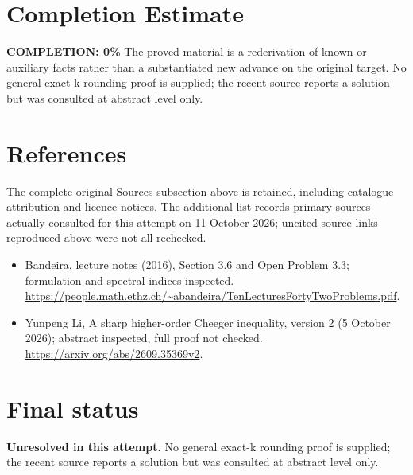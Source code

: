 \documentclass[11pt]{article}
\begin{document}
\section{Completion Estimate}
\noindent\textbf{COMPLETION: 0\%}
The proved material is a rederivation of known or auxiliary facts rather than a substantiated new advance on the original target. No general exact-k rounding proof is supplied; the recent source reports a solution but was consulted at abstract level only.
\section{References}
The complete original Sources subsection above is retained, including catalogue attribution and licence notices. The additional list records primary sources actually consulted for this attempt on 11 October 2026; uncited source links reproduced above were not all rechecked.
\begin{itemize}
\item Bandeira, lecture notes (2016), Section 3.6 and Open Problem 3.3; formulation and spectral indices inspected. \url{https://people.math.ethz.ch/~abandeira/TenLecturesFortyTwoProblems.pdf}.
\item Yunpeng Li, A sharp higher-order Cheeger inequality, version 2 (5 October 2026); abstract inspected, full proof not checked. \url{https://arxiv.org/abs/2609.35369v2}.
\end{itemize}
\section{Final status}
\textbf{Unresolved in this attempt.} No general exact-k rounding proof is supplied; the recent source reports a solution but was consulted at abstract level only.
\end{document}
